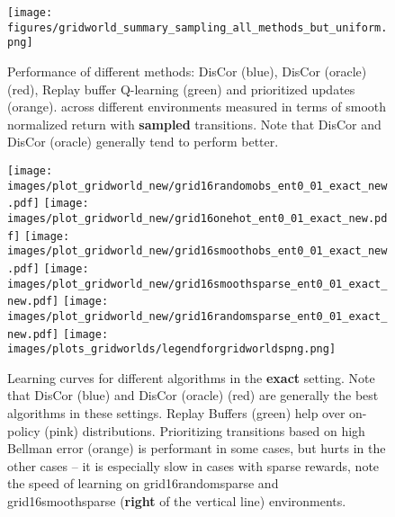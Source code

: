 \documentclass[jmlr]{article}
\begin{document}
\begin{figure}
    \centering
\texttt{[image: figures/gridworld\_summary\_sampling\_all\_methods\_but\_uniform.png]}
    \caption{\footnotesize{Performance of different methods: DisCor (blue), DisCor (oracle) (red), Replay buffer Q-learning (green) and prioritized updates (orange). across different environments measured in terms of smooth normalized return with \textbf{sampled} transitions. Note that DisCor and DisCor (oracle) generally tend to perform better.}}
    \label{fig:app_fig_sampled}
\end{figure}

\begin{figure*}
    \centering
    \texttt{[image: images/plot\_gridworld\_new/grid16randomobs\_ent0\_01\_exact\_new.pdf]}
    \texttt{[image: images/plot\_gridworld\_new/grid16onehot\_ent0\_01\_exact\_new.pdf]}
     \texttt{[image: images/plot\_gridworld\_new/grid16smoothobs\_ent0\_01\_exact\_new.pdf]}
     \vline
    \texttt{[image: images/plot\_gridworld\_new/grid16smoothsparse\_ent0\_01\_exact\_new.pdf]}
    \texttt{[image: images/plot\_gridworld\_new/grid16randomsparse\_ent0\_01\_exact\_new.pdf]}
    \texttt{[image: images/plots\_gridworlds/legendforgridworldspng.png]}
    \caption{\footnotesize{Learning curves for different algorithms in the \textbf{exact} setting. Note that DisCor (blue) and DisCor (oracle) (red) are generally the best algorithms in these settings. Replay Buffers (green) help over on-policy (pink) distributions. Prioritizing transitions based on high Bellman error (orange) is performant in some cases, but hurts in the other cases -- it is especially slow in cases with sparse rewards, note the speed of learning on grid16randomsparse and grid16smoothsparse (\textbf{right} of the vertical line) environments.}}
    \label{fig:exact_fqi_runs}
\end{figure*}
\end{document}
